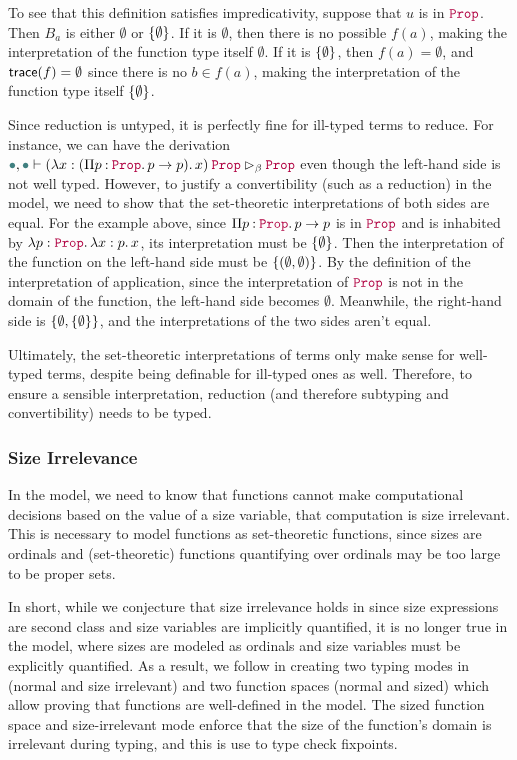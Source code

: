 To see that this definition satisfies impredicativity,
suppose that $u$ is in $\Prop$.
Then $B_a$ is either $\emptyset$ or $\{\emptyset\}$.
If it is $\emptyset$, then there is no possible $f(a)$,
making the interpretation of the function type itself $\emptyset$.
If it is $\{\emptyset\}$, then $f(a) = \emptyset$,
and $\textsf{trace}(f) = \emptyset$ since there is no $b \in f(a)$,
making the interpretation of the function type itself $\{\emptyset\}$.

Since reduction is untyped, it is perfectly fine for ill-typed terms to reduce.
For instance, we can have the derivation
$\mt, \mt \vdash \app{(\abs{x}{(\prod{p}{\Prop}{p \to p})}{x})}{\Prop} \rhd_\beta \Prop$
even though the left-hand side is not well typed.
However, to justify a convertibility (such as a reduction) in the model,
we need to show that the set-theoretic interpretations of both sides are equal.
For the example above, since $\prod{p}{\Prop}{p \to p}$ is in $\Prop$
and is inhabited by $\abs{p}{\Prop}{\abs{x}{p}{x}}$,
its interpretation must be $\{\emptyset\}$.
Then the interpretation of the function on the left-hand side must be $\{(\emptyset, \emptyset)\}$.
By the definition of the interpretation of application,
since the interpretation of $\Prop$ is not in the domain of the function,
the left-hand side becomes $\emptyset$.
Meanwhile, the right-hand side is $\{\emptyset, \{\emptyset\}\}$,
and the interpretations of the two sides aren't equal.

Ultimately, the set-theoretic interpretations of terms only make sense for well-typed terms,
despite being definable for ill-typed ones as well.
Therefore, to ensure a sensible interpretation,
reduction (and therefore subtyping and convertibility) needs to be typed.

\subsubsection{Size Irrelevance}

In the model, we need to know that functions cannot make computational decisions
based on the value of a size variable, \ie that computation is size irrelevant.
This is necessary to model functions as set-theoretic functions, since sizes are
ordinals and (set-theoretic) functions quantifying over ordinals may be too
large to be proper sets.

In short, while we conjecture that size irrelevance holds in \lang since size
expressions are second class and size variables are implicitly quantified, it is
no longer true in the model, where sizes are modeled as ordinals and size
variables must be explicitly quantified.
As a result, we follow \citet{barras-thesis} in creating two typing modes in
\langAnother (normal and size irrelevant) and two function spaces (normal
and sized) which allow proving that functions are well-defined in the model.
The sized function space and size-irrelevant mode enforce that the size of the
function's domain is irrelevant during typing, and this is use to type check
fixpoints.

